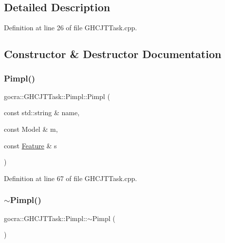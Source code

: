 \subsection{Detailed Description}


Definition at line 26 of file G\+H\+C\+J\+T\+Task.\+cpp.



\subsection{Constructor \& Destructor Documentation}
\hypertarget{structgocra_1_1GHCJTTask_1_1Pimpl_ad413aad5c0e13b459b10d16dc91c8579}{}\label{structgocra_1_1GHCJTTask_1_1Pimpl_ad413aad5c0e13b459b10d16dc91c8579} 
\subsubsection{\texorpdfstring{Pimpl()}{Pimpl()}}
{\footnotesize\ttfamily gocra\+::\+G\+H\+C\+J\+T\+Task\+::\+Pimpl\+::\+Pimpl (\begin{DoxyParamCaption}\item[{const std\+::string \&}]{name,  }\item[{const Model \&}]{m,  }\item[{const \hyperlink{classocra_1_1Feature}{Feature} \&}]{s }\end{DoxyParamCaption})\hspace{0.3cm}{\ttfamily [inline]}}



Definition at line 67 of file G\+H\+C\+J\+T\+Task.\+cpp.

\hypertarget{structgocra_1_1GHCJTTask_1_1Pimpl_a40a8c393004df9cb06d2cacf7a60b55f}{}\label{structgocra_1_1GHCJTTask_1_1Pimpl_a40a8c393004df9cb06d2cacf7a60b55f} 
\subsubsection{\texorpdfstring{$\sim$\+Pimpl()}{~Pimpl()}}
{\footnotesize\ttfamily gocra\+::\+G\+H\+C\+J\+T\+Task\+::\+Pimpl\+::$\sim$\+Pimpl (\begin{DoxyParamCaption}{ }\end{DoxyParamCaption})\hspace{0.3cm}{\ttfamily [inline]}}



